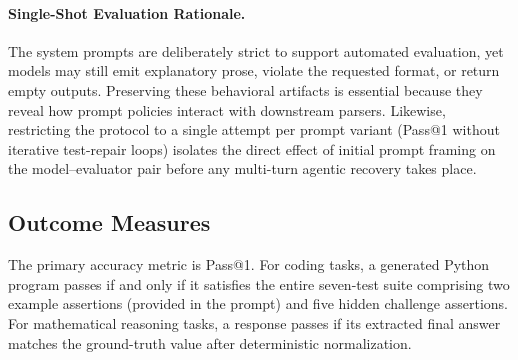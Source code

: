 \documentclass[a4paper,fleqn]{cas-sc}
\begin{document}
\paragraph{Single-Shot Evaluation Rationale.}
The system prompts are deliberately strict to support automated evaluation, yet models may still emit explanatory prose, violate the requested format, or return empty outputs. Preserving these behavioral artifacts is essential because they reveal how prompt policies interact with downstream parsers. Likewise, restricting the protocol to a single attempt per prompt variant (Pass@1 without iterative test-repair loops) isolates the direct effect of initial prompt framing on the model--evaluator pair before any multi-turn agentic recovery takes place.

\subsection{Outcome Measures}\label{outcome-measures}

The primary accuracy metric is Pass@1. For coding tasks, a generated Python program passes if and only if it satisfies the entire seven-test suite comprising two example assertions (provided in the prompt) and five hidden challenge assertions. For mathematical reasoning tasks, a response passes if its extracted final answer matches the ground-truth value after deterministic normalization.
\end{document}

